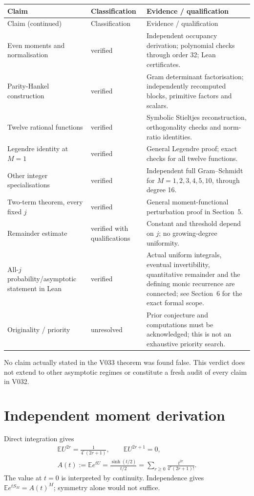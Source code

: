 \documentclass[11pt,a4paper]{article}
\newcommand{\E}{\mathbb E}
\begin{document}
\begin{longtable}{@{}>{\raggedright\arraybackslash}p{.32\linewidth}>{\raggedright\arraybackslash}p{.23\linewidth}>{\raggedright\arraybackslash}p{.39\linewidth}@{}}
\toprule Claim & Classification & Evidence / qualification\\ \midrule
\endfirsthead
\toprule Claim (continued) & Classification & Evidence / qualification\\ \midrule
\endhead
Even moments and normalisation & verified & Independent occupancy derivation; polynomial checks through order 32; Lean certificates.\\
Parity-Hankel construction & verified & Gram determinant factorisation; independently recomputed blocks, primitive factors and scalars.\\
Twelve rational functions & verified & Symbolic Stieltjes reconstruction, orthogonality checks and norm-ratio identities.\\
Legendre identity at $M=1$ & verified & General Legendre proof; exact checks for all twelve functions.\\
Other integer specialisations & verified & Independent full Gram--Schmidt for $M=1,2,3,4,5,10$, through degree 16.\\
Two-term theorem, every fixed $j$ & verified & General moment-functional perturbation proof in Section~5.\\
Remainder estimate & verified with qualifications & Constant and threshold depend on $j$; no growing-degree uniformity.\\
All-$j$ probability/asymptotic statement in Lean & verified & Actual uniform integrals, eventual invertibility, quantitative remainder and the defining monic recurrence are connected; see Section~6 for the exact formal scope.\\
Originality / priority & unresolved & Prior conjecture and computations must be acknowledged; this is not an exhaustive priority search.\\
\bottomrule
\end{longtable}
No claim actually stated in the V033 theorem was found false. This verdict does not extend to other asymptotic regimes or constitute a fresh audit of every claim in V032.

\section{Independent moment derivation}
Direct integration gives
\[
\begin{gathered}
\E U^{2r}=\frac{1}{4^r(2r+1)},\qquad \E U^{2r+1}=0,\\[5pt]
A(t):=\E e^{tU}=\frac{\sinh(t/2)}{t/2}
=\sum_{r\geq0}\frac{t^{2r}}{4^r(2r+1)!}.
\end{gathered}
\]
The value at $t=0$ is interpreted by continuity. Independence gives
$\E e^{tS_M}=A(t)^M$; symmetry alone would not suffice.
\end{document}
